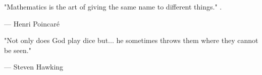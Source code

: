 
\clearpage

\vspace*{5cm}

\begin{center}
   

"Mathematics is the art of giving the same name to different things." .
    
    \medskip
    --- Henri Poincaré
    
\vspace*{2cm}
"Not only does God play dice but... he sometimes throws them where they cannot be seen."

    \medskip
        --- Steven Hawking


\end{center}

